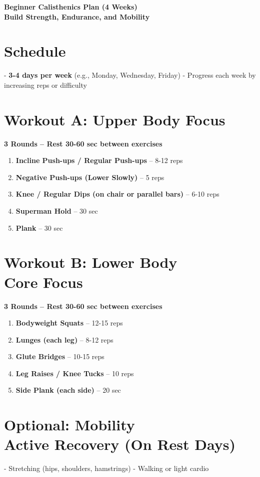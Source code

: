 \documentclass[a4paper,12pt]{article}
\begin{document}
\begin{center}
    {\LARGE\bf Beginner Calisthenics Plan (4 Weeks)}\\[1em]
    \textbf{Build Strength, Endurance, and Mobility}
\end{center}

\section{Schedule}
- \textbf{3-4 days per week} (e.g., Monday, Wednesday, Friday)
- Progress each week by increasing reps or difficulty

\section{Workout A: Upper Body Focus}
\textbf{3 Rounds – Rest 30-60 sec between exercises}
\begin{enumerate}
    \item \textbf{Incline Push-ups / Regular Push-ups} – 8-12 reps
    \item \textbf{Negative Push-ups (Lower Slowly)} – 5 reps
    \item \textbf{Knee / Regular Dips (on chair or parallel bars)} – 6-10 reps
    \item \textbf{Superman Hold} – 30 sec
    \item \textbf{Plank} – 30 sec
\end{enumerate}

\section{Workout B: Lower Body \\ Core Focus}
\textbf{3 Rounds – Rest 30-60 sec between exercises}
\begin{enumerate}
    \item \textbf{Bodyweight Squats} – 12-15 reps
    \item \textbf{Lunges (each leg)} – 8-12 reps
    \item \textbf{Glute Bridges} – 10-15 reps
    \item \textbf{Leg Raises / Knee Tucks} – 10 reps
    \item \textbf{Side Plank (each side)} – 20 sec
\end{enumerate}

\section{Optional: Mobility \\ Active Recovery (On Rest Days)}
- Stretching (hips, shoulders, hamstrings)
- Walking or light cardio
\end{document}

